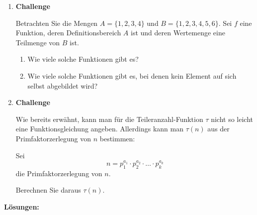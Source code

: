\begin{ueb}
\begin{enumerate}
        \item \textbf{Challenge}

              Betrachten Sie die Mengen
              \(A=\{1,2,3,4\}\) und \(B=\{1,2,3,4,5,6\}\).
              Sei \(f\) eine Funktion, deren Definitionsbereich \(A\) ist
              und deren Wertemenge eine Teilmenge von \(B\) ist.

              \begin{enumerate}
                  \item Wie viele solche Funktionen gibt es?
                  \item Wie viele solche Funktionen gibt es, bei denen
                        kein Element auf sich selbst abgebildet wird?
              \end{enumerate}

        \item \textbf{Challenge}

              Wie bereits erwähnt, kann man für die Teileranzahl-Funktion
              \(\tau\) nicht so leicht eine Funktionsgleichung angeben.
              Allerdings kann man \(\tau(n)\) aus der Primfaktorzerlegung
              von \(n\) bestimmen:

              Sei
              \[
                  n=p_1^{a_1}\cdot p_2^{a_2}\cdot
                  \ldots\cdot p_k^{a_k}
              \]
              die Primfaktorzerlegung von \(n\).

              Berechnen Sie daraus \(\tau(n)\).
    \end{enumerate}
\end{ueb}

\clearpage
\textbf{Lösungen:}


